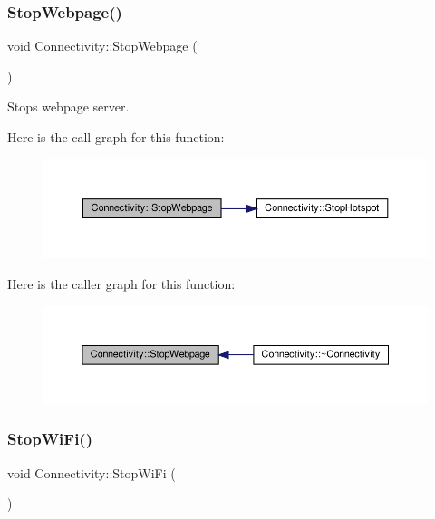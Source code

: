 \subsubsection{\texorpdfstring{Stop\+Webpage()}{StopWebpage()}}
{\footnotesize\ttfamily void Connectivity\+::\+Stop\+Webpage (\begin{DoxyParamCaption}{ }\end{DoxyParamCaption})}



Stops webpage server. 

Here is the call graph for this function\+:
\nopagebreak
\begin{figure}[H]
\begin{center}
\leavevmode
\includegraphics[width=350pt]{classConnectivity_a5a123ddd0c4ab4061d1fa564fe3e7490_cgraph}
\end{center}
\end{figure}
Here is the caller graph for this function\+:
\nopagebreak
\begin{figure}[H]
\begin{center}
\leavevmode
\includegraphics[width=350pt]{classConnectivity_a5a123ddd0c4ab4061d1fa564fe3e7490_icgraph}
\end{center}
\end{figure}
\mbox{\label{classConnectivity_a5c562f136d52c4a91eedba957e68b71e}} 
\subsubsection{\texorpdfstring{Stop\+Wi\+Fi()}{StopWiFi()}}
{\footnotesize\ttfamily void Connectivity\+::\+Stop\+Wi\+Fi (\begin{DoxyParamCaption}{ }\end{DoxyParamCaption})}



